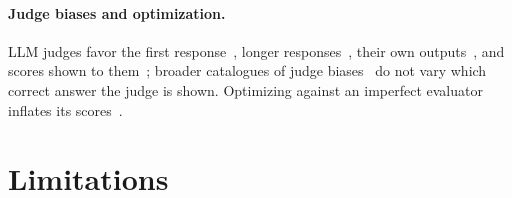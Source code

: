 \documentclass{article}
\begin{document}
\paragraph{Judge biases and optimization.}
LLM judges favor the first response~\citep{wang2024fair}, longer responses~\citep{dubois2024lengthcontrolled}, their own outputs~\citep{panickssery2024llm}, and scores shown to them~\citep{kapetanovic2026anchoring}; broader catalogues of judge biases~\citep{koo2024benchmarking,ye2025justice} do not vary which correct answer the judge is shown. Optimizing against an imperfect evaluator inflates its scores~\citep{gao2022scaling,rafailov2024scaling}.

\section{Limitations}
\label{sec:limits}
\end{document}
